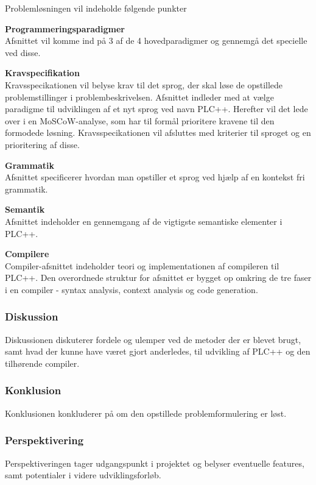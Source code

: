 Problemløsningen vil indeholde følgende punkter
\begin{itemize_small}
    \item \textbf{Programmeringsparadigmer}\\
    Afsnittet vil komme ind på 3 af de 4 hovedparadigmer og gennemgå det specielle ved disse.
    \item \textbf{Kravspecifikation}\\
    Kravsspecikationen vil belyse krav til det sprog, der skal løse de opstillede problemstillinger i problembeskrivelsen. Afsnittet indleder med at vælge paradigme til udviklingen af et nyt sprog ved navn PLC++. Herefter vil det lede over i en MoSCoW-analyse, som har til formål prioritere kravene til den formodede løsning. Kravsspecikationen vil afsluttes med kriterier til sproget og en prioritering af disse.
    \item \textbf{Grammatik}\\ Afsnittet specificerer hvordan man opstiller et sprog ved hjælp af en kontekst fri grammatik.
    \item \textbf{Semantik}\\
    Afsnittet indeholder en gennemgang af de vigtigste semantiske elementer i PLC++.
    \item \textbf{Compilere}\\
    Compiler-afsnittet indeholder teori og implementationen af compileren til PLC++. Den overordnede struktur for afsnittet er bygget op omkring de tre faser i en compiler - syntax analysis, context analysis og code generation.
\end{itemize_small}

\subsubsection*{Diskussion}
Diskussionen diskuterer fordele og ulemper ved de metoder der er blevet brugt, samt hvad der kunne have været gjort anderledes, til udvikling af PLC++ og den tilhørende compiler. 
\subsubsection*{Konklusion}
Konklusionen konkluderer på om den opstillede problemformulering er løst.

\subsubsection*{Perspektivering}
Perspektiveringen tager udgangspunkt i projektet og belyser eventuelle features, samt potentialer i videre udviklingsforløb.

